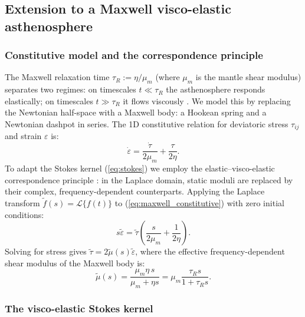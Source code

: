 \documentclass[extra]{gji}
\begin{document}
\subsection{Extension to a Maxwell visco-elastic asthenosphere}
\label{sec:maxwell_model}

\subsubsection{Constitutive model and the correspondence principle}

The Maxwell relaxation time $\tau_R := \eta/\mu_m$ (where $\mu_m$ is
the mantle shear modulus) separates two regimes: on timescales
$t \ll \tau_R$ the asthenosphere responds elastically; on timescales
$t \gg \tau_R$ it flows viscously \citep{burgmann2008rheology}.
We model this by replacing the Newtonian half-space with a Maxwell body: a
Hookean spring and a Newtonian dashpot in series. The 1D constitutive relation
for deviatoric stress $\tau_{ij}$ and strain $\varepsilon$ is:
\begin{equation}
\dot{\varepsilon} = \frac{\dot{\tau}}{2\mu_m} + \frac{\tau}{2\eta}.
\label{eq:maxwell_constitutive}
\end{equation}
To adapt the Stokes kernel (\ref{eq:stokes}) we employ the elastic--visco-elastic
correspondence principle \citep{hetland2005postseismic,barbot2010unified}:
in the Laplace domain, static moduli are replaced by their complex,
frequency-dependent counterparts. Applying the Laplace transform
$\tilde{f}(s)=\mathcal{L}\{f(t)\}$ to (\ref{eq:maxwell_constitutive}) with zero
initial conditions:
\begin{equation}
s\tilde{\varepsilon} = \tilde{\tau}\!\left(\frac{s}{2\mu_m}+\frac{1}{2\eta}\right).
\label{eq:laplace_ve}
\end{equation}
Solving for stress gives $\tilde{\tau} = 2\tilde{\mu}(s)\tilde{\varepsilon}$,
where the effective frequency-dependent shear modulus of the Maxwell body is:
\begin{equation}
\tilde{\mu}(s) = \frac{\mu_m\eta\,s}{\mu_m + \eta s}
               = \mu_m\frac{\tau_R s}{1+\tau_R s}.
\label{eq:maxwell_mu}
\end{equation}

\subsubsection{The visco-elastic Stokes kernel}
\end{document}
